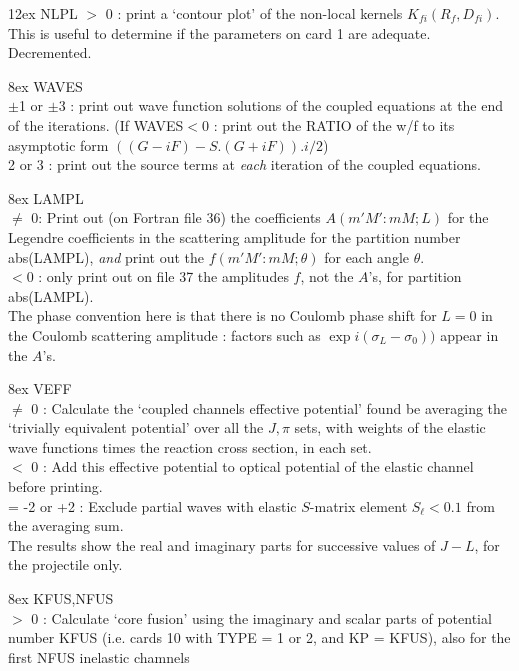 \documentclass[11pt]{article}
\begin{document}
\hangindent 12ex
NLPL   $>$ 0 : print a `contour plot' of the non-local kernels
$K_{fi}(R_{f},D_{fi})$.  This is useful to determine if the parameters on card 1
are adequate.  Decremented.

\hangindent 8ex  WAVES
\\  $\pm$1 or $\pm$3 : print out wave function solutions of the coupled
equations at the end of the iterations.
(If WAVES$<$0 : print out the RATIO of the w/f to its asymptotic
form $((G-iF) - S.(G+iF)).i/2$)
\\  2 or 3     : print out the source terms at
{\em each} iteration of the coupled equations.



\hangindent 8ex  LAMPL
\\  $\neq$ 0: Print out (on Fortran file 36)
the coefficients $A(m'M':mM; L)$ for the Legendre
coefficients in the scattering amplitude for the partition number
abs(LAMPL),
{\em and}
print out the $f(m'M':mM; \theta)$ for each angle $\theta$.
\\ $<$0 : only print out on file 37 the amplitudes $f$, not the $A$'s,
for partition abs(LAMPL).
\\
The phase convention here is that there is no Coulomb phase shift
for $L = 0$ in the Coulomb scattering amplitude : factors such as
$\exp i(\sigma_L-\sigma_0))$  appear in the $A$'s.



\hangindent 8ex
VEFF
\\  $\neq$ 0 : Calculate the `coupled channels effective potential'
found be averaging the `trivially equivalent potential' over all
the $J,\pi$ sets, with weights of the elastic wave functions
times the reaction cross section, in each set.
\\  $<$  0 : Add this effective potential to optical potential
of the elastic channel before printing.
\\  = -2 or +2 : Exclude partial waves with elastic $S$-matrix element
$S_\ell< 0.1$ from the averaging sum.
\\ The results show the real and imaginary parts for successive
values of $J-L$, for the projectile only.



\hangindent 8ex
KFUS,NFUS
\\  $>$ 0 :  Calculate `core fusion' using the imaginary and scalar
parts of potential number KFUS (i.e. cards 10 with TYPE = 1 or 2,
and KP = KFUS), also for the first NFUS inelastic chamnels
\end{document}
